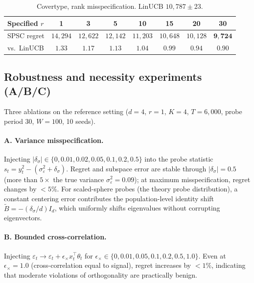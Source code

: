 \documentclass{article}
\begin{document}
\begin{table}[!htbp]
\centering
\caption{Covertype, rank misspecification. LinUCB $10{,}787\pm 23$.}
\label{tab:rank_misspec}
\small
\begin{tabular}{lccccccc}
\toprule
Specified $r$ & 1 & 3 & 5 & \textbf{10} & 15 & 20 & 30 \\
\midrule
SPSC regret & $14{,}294$ & $12{,}622$ & $12{,}142$ & $11{,}203$ & $10{,}648$ & $10{,}128$ & $\mathbf{9{,}724}$ \\
vs.\ LinUCB & $1.33$ & $1.17$ & $1.13$ & $1.04$ & $0.99$ & $0.94$ & $\mathbf{0.90}$ \\
\bottomrule
\end{tabular}
\end{table}

\subsection{Robustness and necessity experiments (A/B/C)}
\label{app:robustness_abc}

Three ablations on the reference setting ($d{=}4$, $r{=}1$, $K{=}4$,
$T{=}6{,}000$, probe period 30, $W{=}100$, 10 seeds).

\paragraph{A. Variance misspecification.}
Injecting $|\delta_\sigma|\in\{0,0.01,0.02,0.05,0.1,0.2,0.5\}$ into
the probe statistic $s_t=y_t^2-(\sigma_\varepsilon^2+\delta_\sigma)$.
Regret and subspace error are stable through $|\delta_\sigma|=0.5$
(more than $5\times$ the true variance $\sigma_\varepsilon^2=0.09$);
at maximum misspecification, regret changes by $<5\%$. For
scaled-sphere probes (the theory probe distribution), a constant
centering error contributes the population-level identity shift
$\widetilde B = -(\delta_\sigma/d)I_d$, which uniformly shifts
eigenvalues without corrupting eigenvectors.

\paragraph{B. Bounded cross-correlation.}
Injecting $\varepsilon_t\to\varepsilon_t+\epsilon_\times x_t^\top\theta_t$
for $\epsilon_\times\in\{0,0.01,0.05,0.1,0.2,0.5,1.0\}$. Even at
$\epsilon_\times=1.0$ (cross-correlation equal to signal), regret
increases by $<1\%$, indicating that moderate violations of orthogonality are
practically benign.
\end{document}

